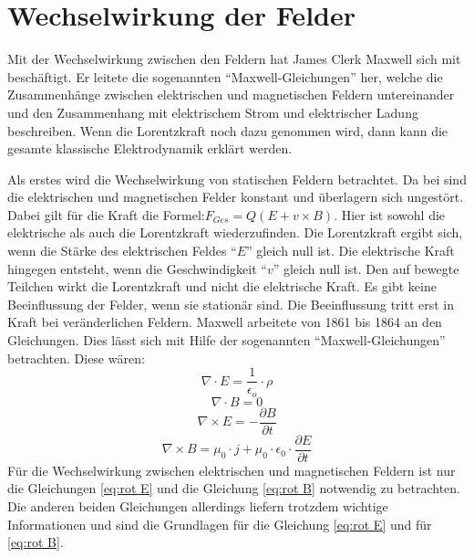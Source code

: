 \section{Wechselwirkung der Felder}%
\label{sec:Maxwell}
Mit der Wechselwirkung zwischen den Feldern hat James Clerk Maxwell sich mit beschäftigt.
Er leitete die sogenannten "`Maxwell-Gleichungen"' her, welche die Zusammenhänge zwischen elektrischen und magnetischen Feldern untereinander und den Zusammenhang mit elektrischem Strom und elektrischer Ladung beschreiben.
Wenn die Lorentzkraft noch dazu genommen wird, dann kann die gesamte klassische Elektrodynamik erklärt werden.

Als erstes wird die Wechselwirkung von statischen Feldern betrachtet.
Da bei sind die elektrischen und magnetischen Felder konstant und überlagern sich ungestört.
Dabei gilt für die Kraft die Formel:$F_{Ges} = Q (E + v \times B)$.
Hier ist sowohl die elektrische als auch die Lorentzkraft wiederzufinden.
Die Lorentzkraft ergibt sich, wenn die Stärke des elektrischen Feldes "`$E$"' gleich null ist.
Die elektrische Kraft hingegen entsteht, wenn die Geschwindigkeit "`$v$"' gleich null ist.
Den auf bewegte Teilchen wirkt die Lorentzkraft und nicht die elektrische Kraft.
Es gibt keine Beeinflussung der Felder, wenn sie stationär sind. 
Die Beeinflussung tritt erst in Kraft bei veränderlichen Feldern.
Maxwell arbeitete von 1861 bis 1864 an den Gleichungen.
Dies lässt sich mit Hilfe der sogenannten "`Maxwell-Gleichungen"' betrachten.
Diese wären:
\begin{equation}
\label{eq:div E}
    \nabla \cdot E = \frac{1}{\epsilon_o} \cdot \rho
\end{equation}
\begin{equation}
\label{eq: div B}
    \nabla \cdot B = 0
\end{equation}
\begin{equation}
\label{eq:rot E}
    \nabla \times E = - \frac{\partial B}{\partial t}
\end{equation}
\begin{equation}
\label{eq:rot B}
    \nabla \times B = \mu_0 \cdot j + \mu_0 \cdot \epsilon_0 \cdot \frac{\partial E}{\partial t}
\end{equation}
Für die Wechselwirkung zwischen elektrischen und magnetischen Feldern ist nur die Gleichungen \ref{eq:rot E} und die Gleichung \ref{eq:rot B} notwendig zu betrachten.
Die anderen beiden Gleichungen allerdings liefern trotzdem wichtige Informationen und sind die Grundlagen für die Gleichung \ref{eq:rot E} und für \ref{eq:rot B}.
